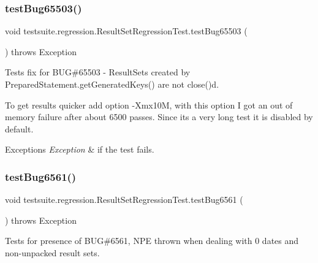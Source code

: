 \subsubsection{\texorpdfstring{test\+Bug65503()}{testBug65503()}}
{\footnotesize\ttfamily void testsuite.\+regression.\+Result\+Set\+Regression\+Test.\+test\+Bug65503 (\begin{DoxyParamCaption}{ }\end{DoxyParamCaption}) throws Exception}

Tests fix for B\+UG\#65503 -\/ Result\+Sets created by Prepared\+Statement.\+get\+Generated\+Keys() are not close()d.

To get results quicker add option -\/\+Xmx10M, with this option I got an out of memory failure after about 6500 passes. Since it\textquotesingle{}s a very long test it is disabled by default.


\begin{DoxyExceptions}{Exceptions}
{\em Exception} & if the test fails. \\
\hline
\end{DoxyExceptions}
\mbox{\label{classtestsuite_1_1regression_1_1_result_set_regression_test_acd7be9d4220a08025d79f53a76395993}} 
\subsubsection{\texorpdfstring{test\+Bug6561()}{testBug6561()}}
{\footnotesize\ttfamily void testsuite.\+regression.\+Result\+Set\+Regression\+Test.\+test\+Bug6561 (\begin{DoxyParamCaption}{ }\end{DoxyParamCaption}) throws Exception}

Tests for presence of B\+UG\#6561, N\+PE thrown when dealing with 0 dates and non-\/unpacked result sets.


